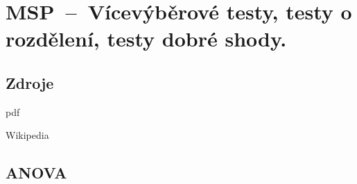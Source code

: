 

\graphicspath{{msp/testy/figures}}


\chapter{MSP~--~Vícevýběrové testy, testy o rozdělení, testy dobré shody.}


\section{Zdroje}

\begin{compactitem}
    \item {}pdf
    \item {}
    \item {}
    \item Wikipedia
\end{compactitem}


\section{ANOVA}


